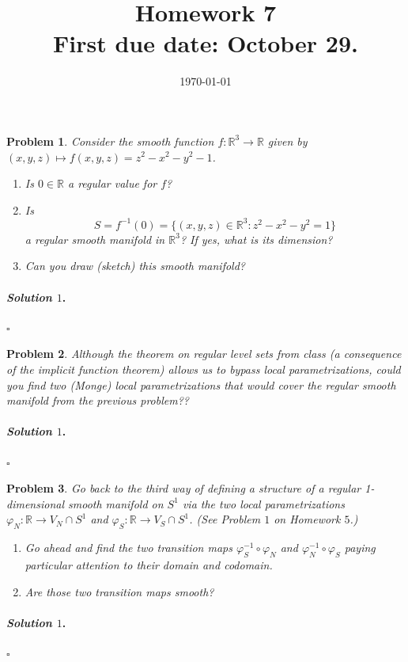 \documentclass[reqno]{amsart}
\theoremstyle{plain}
\newtheorem{problem}{Problem}
\theoremstyle{definition}
\newenvironment{solution1}{\paragraph{\emph{Solution $1$}.}}{\hfill$\square$}
\begin{document}
 

\title[Homework 7]{Homework 7 \\ First due date: October 29.}

\date{\today} 
\maketitle 


\begin{problem}
Consider the smooth function $f:\mathbb{R}^{3} \rightarrow \mathbb{R}$ given by $(x,y,z) \mapsto f(x,y,z) = z^{2} - x^{2} - y^{2} -1$.  
\begin{enumerate}
\item Is $0 \in \mathbb{R}$ a regular value for $f$?  
\item Is 
$$S = f^{-1}(0) =  \{(x,y,z) \in \mathbb{R}^{3} : z^{2} - x^{2} - y^{2} = 1\} $$
a regular smooth manifold in $\mathbb{R}^{3}$?  If yes, what is its dimension?  
\item Can you draw (sketch) this smooth manifold?
\end{enumerate}
\end{problem}
\begin{solution1}

\end{solution1}

\begin{problem}
Although the theorem on regular level sets from class (a consequence of the implicit function theorem) allows us to bypass local parametrizations, could you find two (Monge) local parametrizations that would cover the regular smooth manifold from the previous problem??
\end{problem}
\begin{solution1}

\end{solution1}

\begin{problem}
Go back to the third way of defining a structure of a regular 1-dimensional smooth manifold on $S^{1}$ via the two local parametrizations $\varphi_{N}: \mathbb{R} \rightarrow V_{N} \cap S^{1}$ and $\varphi_{S}: \mathbb{R} \rightarrow V_{S} \cap S^{1}$.  (See Problem $1$ on Homework $5$.)  
\begin{enumerate}
\item Go ahead and find the two transition maps $\varphi_{S}^{-1} \circ \varphi_{N}$ and $\varphi_{N}^{-1} \circ \varphi_{S}$ paying particular attention to their domain and codomain.  
\item Are those two transition maps smooth?
\end{enumerate}
\end{problem}
\begin{solution1}

\end{solution1}
\end{document}
